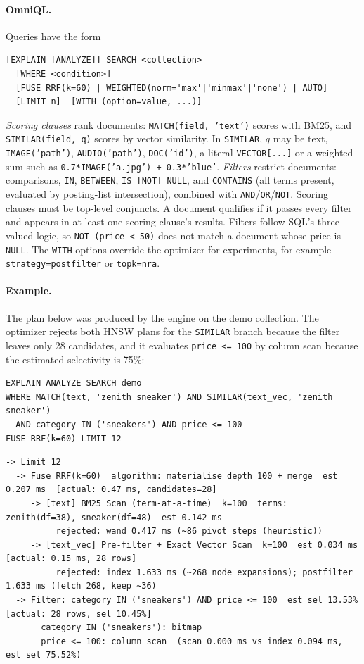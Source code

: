 \documentclass[11pt,a4paper]{article}
\newcommand{\code}[1]{\texttt{\small #1}}
\begin{document}
\paragraph{OmniQL.} Queries have the form
\begin{lstlisting}[language=OmniQL]
[EXPLAIN [ANALYZE]] SEARCH <collection>
  [WHERE <condition>]
  [FUSE RRF(k=60) | WEIGHTED(norm='max'|'minmax'|'none') | AUTO]
  [LIMIT n]  [WITH (option=value, ...)]
\end{lstlisting}
\emph{Scoring clauses} rank documents: \code{MATCH(field, 'text')} scores with BM25, and
\code{SIMILAR(field, q)} scores by vector similarity. In \code{SIMILAR}, $q$ may be text,
\code{IMAGE('path')}, \code{AUDIO('path')}, \code{DOC('id')}, a literal \code{VECTOR[...]} or a
weighted sum such as \code{0.7*IMAGE('a.jpg') + 0.3*'blue'}. \emph{Filters} restrict documents:
comparisons, \code{IN}, \code{BETWEEN}, \code{IS [NOT] NULL}, and \code{CONTAINS} (all terms present,
evaluated by posting-list intersection), combined with \code{AND}/\code{OR}/\code{NOT}. Scoring
clauses must be top-level conjuncts. A document qualifies if it passes every filter and appears in at
least one scoring clause's results. Filters follow SQL's three-valued logic, so \code{NOT (price < 50)}
does not match a document whose price is \code{NULL}. The \code{WITH} options override the optimizer
for experiments, for example \code{strategy=postfilter} or \code{topk=nra}.

\paragraph{Example.} The plan below was produced by the engine on the demo collection. The optimizer
rejects both HNSW plans for the \code{SIMILAR} branch because the filter leaves only 28 candidates,
and it evaluates \code{price <= 100} by column scan because the estimated selectivity is 75\%:
\begin{lstlisting}[language=OmniQL]
EXPLAIN ANALYZE SEARCH demo
WHERE MATCH(text, 'zenith sneaker') AND SIMILAR(text_vec, 'zenith sneaker')
  AND category IN ('sneakers') AND price <= 100
FUSE RRF(k=60) LIMIT 12
\end{lstlisting}
\begin{lstlisting}[basicstyle=\ttfamily\scriptsize]
-> Limit 12
  -> Fuse RRF(k=60)  algorithm: materialise depth 100 + merge  est 0.207 ms  [actual: 0.47 ms, candidates=28]
     -> [text] BM25 Scan (term-at-a-time)  k=100  terms: zenith(df=38), sneaker(df=48)  est 0.142 ms
          rejected: wand 0.417 ms (~86 pivot steps (heuristic))
     -> [text_vec] Pre-filter + Exact Vector Scan  k=100  est 0.034 ms  [actual: 0.15 ms, 28 rows]
          rejected: index 1.633 ms (~268 node expansions); postfilter 1.633 ms (fetch 268, keep ~36)
  -> Filter: category IN ('sneakers') AND price <= 100  est sel 13.53%  [actual: 28 rows, sel 10.45%]
       category IN ('sneakers'): bitmap
       price <= 100: column scan  (scan 0.000 ms vs index 0.094 ms, est sel 75.52%)
\end{lstlisting}
\end{document}
